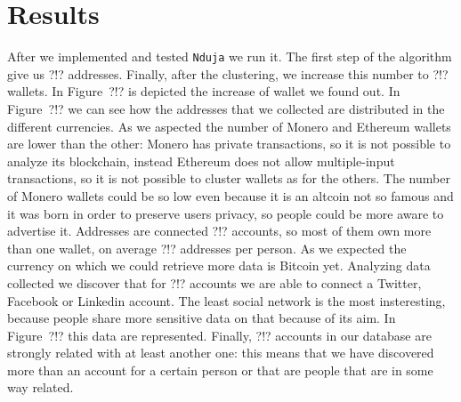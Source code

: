 \section{Results}
After we implemented and tested \texttt{Nduja} we run it. The first step of the
algorithm give us ?!? addresses. Finally, after the clustering, we increase
this number to ?!? wallets. In Figure~?!? is depicted the increase of wallet we
found out. In Figure~?!? we can see how the addresses that we collected are
distributed in the different currencies. As we aspected the number of Monero
and Ethereum wallets are lower than the other: Monero has private transactions,
so it is not possible to analyze its blockchain, instead Ethereum does not
allow multiple-input transactions, so it is not possible to cluster wallets as
for the others. The number of Monero wallets could be so low even because it is
an altcoin not so famous and it was born in order to preserve users privacy, so
people could be more aware to advertise it. Addresses are connected ?!?
accounts, so most of them own more than one wallet, on average ?!? addresses
per person. As we expected the currency on which we could retrieve more data is
Bitcoin yet. Analyzing data collected we discover that for ?!? accounts we are
able to connect a Twitter, Facebook or Linkedin account. The least social
network is the most insteresting, because people share more sensitive data on
that because of its aim. In Figure~?!? this data are represented. Finally, ?!? accounts in our database are strongly related with at least another one: this means that we have discovered more than an account for a certain person or that are people that are in some way related.